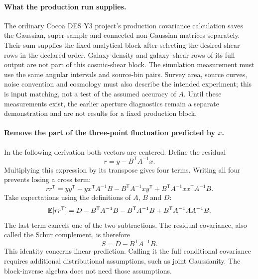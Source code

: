 \paragraph{What the production run supplies.}
The ordinary Cocoa DES Y3 project's production covariance calculation
saves the Gaussian, super-sample and connected non-Gaussian matrices
separately. Their sum supplies the fixed
analytical block after selecting the desired shear rows in the declared
order. Galaxy-density and galaxy--shear rows of its full output are not
part of this cosmic-shear block. The simulation measurement must use the
same angular intervals and source-bin pairs. Survey area, source curves,
noise convention and cosmology must also describe the intended experiment;
this is input matching, not a test of the assumed accuracy of $A$.
Until these measurements exist, the earlier aperture diagnostics remain a
separate demonstration and are not results for a fixed production block.

\paragraph{Remove the part of the three-point fluctuation predicted by $x$.}
In the following derivation both vectors are centered. Define the residual
\begin{equation}
 r=y-B^{\mathsf T}A^{-1}x.
\end{equation}
Multiplying this expression by its transpose gives four terms. Writing all
four prevents losing a cross term:
\begin{equation}
 rr^{\mathsf T}=yy^{\mathsf T}
 -yx^{\mathsf T}A^{-1}B
 -B^{\mathsf T}A^{-1}xy^{\mathsf T}
 +B^{\mathsf T}A^{-1}xx^{\mathsf T}A^{-1}B.
\end{equation}
Take expectations using the definitions of $A$, $B$ and $D$:
\begin{equation}
 \mathbb{E}[rr^{\mathsf T}]=D-B^{\mathsf T}A^{-1}B
 -B^{\mathsf T}A^{-1}B+B^{\mathsf T}A^{-1}AA^{-1}B.
\end{equation}
The last term cancels one of the two subtractions. The residual covariance,
also called the Schur complement, is therefore
\begin{equation}
 S=D-B^{\mathsf T}A^{-1}B.
\end{equation}
This identity concerns linear prediction. Calling it the full conditional
covariance requires additional distributional assumptions, such as joint
Gaussianity. The block-inverse algebra does not need those assumptions.


